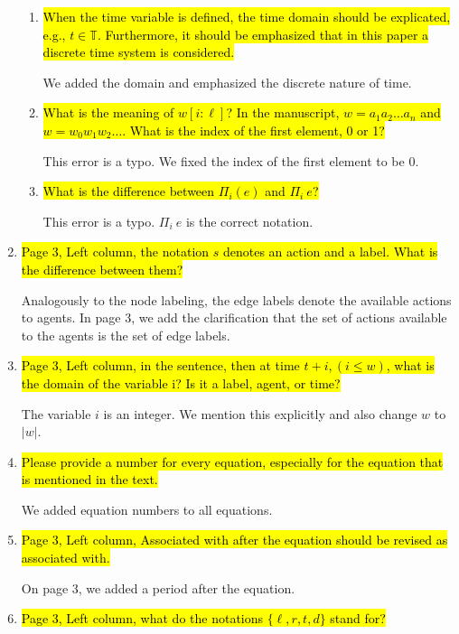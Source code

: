 \documentclass{article}[12pt]
\begin{document}
\begin{enumerate}
\begin{enumerate}
\item  \hl{When the time variable is defined, the time domain should be explicated, e.g., $t \in \mathbb{T}$. Furthermore, it should be emphasized that in this paper a discrete time system is considered.}

We added the domain and emphasized the discrete nature of time. 

\item \hl{What is the meaning of $w[i : \ell]$? In the manuscript, $w = a_1a_2 \dots a_n$ and $w = w_0w_1w_2 \dots$. What is the index of the first element, 0 or 1?}

This error is a typo. We fixed the index of the first element to be 0.

\item \hl{What is the difference between $\Pi_i(e)$ and $\Pi_i~e$?}

This error is a typo. $\Pi_i~e$ is the correct notation.

\end{enumerate}

\item \hl{Page 3, Left column, the notation $s$ denotes an action and a label. What is the difference between them?}

Analogously to the node labeling, the edge labels denote the available actions to agents. In page 3, we add the clarification that the set of actions available to the agents is the set of edge labels. 

\item \hl{Page 3, Left column, in the sentence, then at time $t + i, (i \leq w)$, what is the domain of the variable i? Is it a label, agent, or time?}

The variable $i$ is an integer. We mention this explicitly and also change $w$ to $|w|$. 

\item \hl{Please provide a number for every equation, especially for the equation that is mentioned in the text.}
	
We added equation numbers to all equations.

\item \hl{Page 3, Left column, Associated with after the equation should be revised as associated with.}
	
On page 3, we added a period after the equation.

\item \hl{Page 3, Left column, what do the notations $\{\ell, r, t, d\}$ stand for?}


\end{enumerate}
\end{document}
